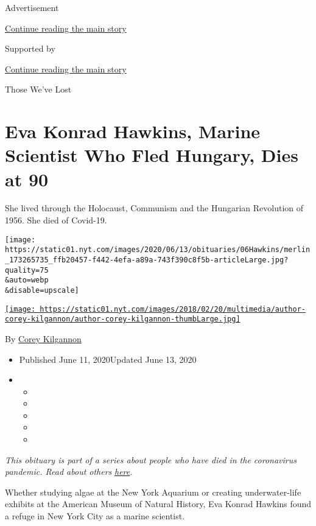 Advertisement

\protect\hyperlink{after-top}{Continue reading the main story}

Supported by

\protect\hyperlink{after-sponsor}{Continue reading the main story}

Those We've Lost

\hypertarget{eva-konrad-hawkins-marine-scientist-who-fled-hungary-dies-at-90}{%
\section{Eva Konrad Hawkins, Marine Scientist Who Fled Hungary, Dies at
90}\label{eva-konrad-hawkins-marine-scientist-who-fled-hungary-dies-at-90}}

She lived through the Holocaust, Communism and the Hungarian Revolution
of 1956. She died of Covid-19.

\texttt{[image: https://static01.nyt.com/images/2020/06/13/obituaries/06Hawkins/merlin\_173265735\_ffb20457-f442-4efa-a89a-743f390c8f5b-articleLarge.jpg?quality=75\\\&auto=webp\\\&disable=upscale]}

\href{https://www.nytimes.com/by/corey-kilgannon}{\texttt{[image: https://static01.nyt.com/images/2018/02/20/multimedia/author-corey-kilgannon/author-corey-kilgannon-thumbLarge.jpg]}}

By \href{https://www.nytimes.com/by/corey-kilgannon}{Corey Kilgannon}

\begin{itemize}
\item
  Published June 11, 2020Updated June 13, 2020
\item
  \begin{itemize}
  \item
  \item
  \item
  \item
  \item
  \end{itemize}
\end{itemize}

\emph{This obituary is part of a series about people who have died in
the coronavirus pandemic. Read about others}
\href{https://www.nytimes.com/interactive/2020/obituaries/people-died-coronavirus-obituaries.html}{\emph{here}}\emph{.}

Whether studying algae at the New York Aquarium or creating
underwater-life exhibits at the American Museum of Natural History, Eva
Konrad Hawkins found a refuge in New York City as a marine scientist.

